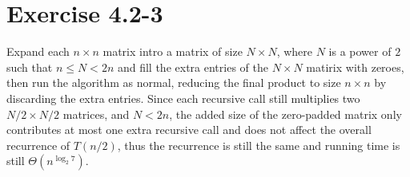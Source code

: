 \documentclass{article}
\begin{document}
\section*{Exercise 4.2-3}

Expand each $n \times n$ matrix intro a matrix of size $N \times N$, where $N$ is a power of $2$ such that $n \leq N < 2n$ and fill the extra entries of the $N \times N$ matirix with zeroes, then run the algorithm as normal, reducing the final product to size $n \times n$ by discarding the extra entries. Since each recursive call still multiplies two $N/2 \times N/2$ matrices, and $N < 2n$, the added size of the zero-padded matrix only contributes at most one extra recursive call and does not affect the overall recurrence of $T(n/2)$, thus the recurrence is still the same and running time is still $\Theta(n^{\log_2 7})$.
\end{document}
